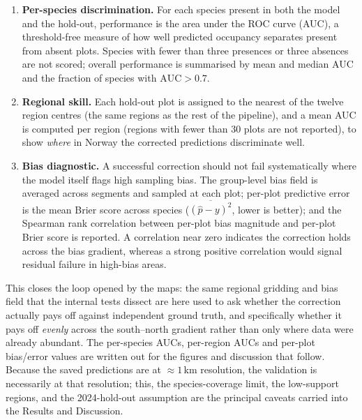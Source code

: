 \begin{enumerate}
  \item \textbf{Per-species discrimination.} For each species present in
        both the model and the hold-out, performance is the area under the
        ROC curve (AUC), a threshold-free measure of how well predicted
        occupancy separates present from absent plots. Species with fewer
        than three presences or three absences are not scored; overall
        performance is summarised by mean and median AUC and the fraction of
        species with $\mathrm{AUC}>0.7$.
  \item \textbf{Regional skill.} Each hold-out plot is assigned to the
        nearest of the twelve region centres (the same regions as the rest
        of the pipeline), and a mean AUC is computed per region (regions with
        fewer than $30$ plots are not reported), to show \emph{where} in
        Norway the corrected predictions discriminate well.
  \item \textbf{Bias diagnostic.} A successful correction should not fail
        systematically where the model itself flags high sampling bias. The
        group-level bias field is averaged across segments and sampled at
        each plot; per-plot predictive error is the mean Brier score across
        species ($\overline{(\hat p - y)^2}$, lower is better); and the
        Spearman rank correlation between per-plot bias magnitude and per-plot
        Brier score is reported. A correlation near zero indicates the
        correction holds across the bias gradient, whereas a strong positive
        correlation would signal residual failure in high-bias areas.
\end{enumerate}

\noindent
This closes the loop opened by the maps: the same regional gridding and
bias field that the internal tests dissect are here used to ask whether the
correction actually pays off against independent ground truth, and
specifically whether it pays off \emph{evenly} across the south--north
gradient rather than only where data were already abundant. The
per-species AUCs, per-region AUCs and per-plot bias/error values are written
out for the figures and discussion that follow. Because the saved
predictions are at $\approx 1$\,km resolution, the validation is necessarily
at that resolution; this, the species-coverage limit, the low-support
regions, and the 2024-hold-out assumption are the principal caveats carried
into the Results and Discussion.
